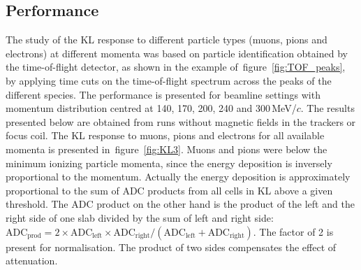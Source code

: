 \subsection{Performance}
\label{SubSect:KL_Performance}

The study of the KL response to different particle types (muons, pions and electrons) at different momenta was based on particle identification obtained by the time-of-flight detector, as shown in the example of~figure~\ref{fig:TOF_peaks}, by applying time cuts on the time-of-flight spectrum across the peaks of the different species. The performance is presented for beamline settings with momentum distribution centred at 140, 170, 200, 240 and 300\,MeV/$c$. The results presented below are obtained from runs without magnetic fields in the trackers or focus coil. The KL response to muons, pions and electrons for all available momenta is presented in~figure~\ref{fig:KL3}.
Muons and pions were below the minimum ionizing particle momenta, since the energy deposition is inversely proportional to the momentum.
Actually the energy deposition is approximately proportional to the sum of ADC products from all cells in KL above a given threshold. The ADC product on the other hand is the product of the left and the right side of one slab divided by the sum of left and right side: $\text{ADC}_{\text{prod}} = 2 \times \text{ADC}_{\text{left}} \times \text{ADC}_{\text{right}} / (\text{ADC}_{\text{left}} + \text{ADC}_{\text{right}})$. The factor of 2 is present for normalisation. The product of two sides compensates the effect of attenuation.
